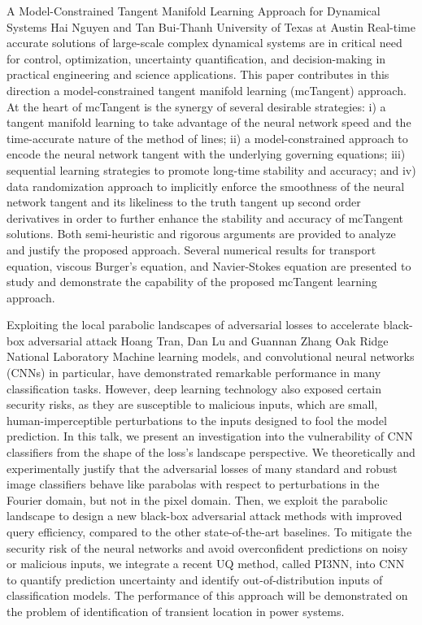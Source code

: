 \begin{addmargin}[2em]{0em}
\vspace{1.5ex}
\abs
{A Model-Constrained Tangent Manifold Learning Approach for Dynamical Systems}
{Hai Nguyen and Tan Bui-Thanh}
{University of Texas at Austin}
{Real-time accurate solutions of large-scale complex dynamical systems are in critical need for control, optimization, uncertainty quantification, and decision-making in practical engineering and science applications. This paper contributes in this direction a model-constrained tangent manifold learning (mcTangent) approach. At the heart of mcTangent is the synergy of several desirable strategies: i) a tangent manifold learning to take advantage of the neural network speed and the time-accurate nature of the method of lines; ii) a model-constrained approach to encode the neural network tangent with the underlying governing equations; iii) sequential learning strategies to promote long-time stability and accuracy; and iv) data randomization approach to implicitly enforce the smoothness of the neural network tangent and its likeliness to the truth tangent up second order derivatives in order to further enhance the stability and accuracy of mcTangent solutions. Both semi-heuristic and rigorous arguments are provided to analyze and justify the proposed approach. Several numerical results for transport equation, viscous Burger's equation, and Navier-Stokes equation are presented to study and demonstrate the capability of the proposed mcTangent learning approach.}


\vspace{1.5ex}
\abs
{Exploiting the local parabolic landscapes of adversarial losses to accelerate black-box adversarial attack}
{Hoang Tran, Dan Lu and Guannan Zhang}
{Oak Ridge National Laboratory}
{Machine learning models, and convolutional neural networks (CNNs) in particular, have demonstrated remarkable performance in many classification tasks. However, deep learning technology also exposed certain security risks, as they are susceptible to malicious inputs, which are small, human-imperceptible perturbations to the inputs designed to fool the model prediction. In this talk, we present an investigation into the vulnerability of CNN classifiers from the shape of the loss’s landscape perspective. We theoretically and experimentally justify that the adversarial losses of many standard and robust image classifiers behave like parabolas with respect to perturbations in the Fourier domain, but not in the pixel domain. Then, we exploit the parabolic landscape to design a new black-box adversarial attack methods with improved query efficiency, compared to the other state-of-the-art baselines. To mitigate the security risk of the neural networks and avoid overconfident predictions on noisy or malicious inputs, we integrate a recent UQ method, called PI3NN, into CNN to quantify prediction uncertainty and identify out-of-distribution inputs of classification models. The performance of this approach will be demonstrated on the problem of identification of transient location in power systems.}



\end{addmargin}
